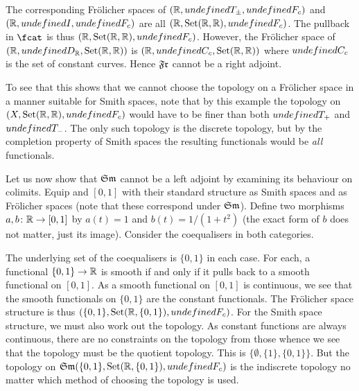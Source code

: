 \documentclass[%
a4paper,%
arxiv,%
defaults
]{myclass}
\begin{document}
The corresponding Fr\"olicher spaces of
 \((\R, \m{T}_\pm, \m{F}_c)\)
and \((\R, \m{I}, \m{F}_c)\)
are all
 \((\R, \Set(\R,\R), \m{F}_c)\).
The pullback in \(\fcat\) is thus
 \((\R, \Set(\R,\R), \m{F}_c)\).
However, the Fr\"olicher space of \((\R, \m{D}_{\R}, \Set(\R,\R))\) is
 \((\R, \m{C}_c, \Set(\R,\R))\)
where \(\m{C}_c\) is the set of constant curves.
Hence \(\SmFr\) cannot be a right adjoint.

To see that this shows that we cannot choose the topology on a Fr\"olicher space in a manner suitable for Smith spaces, note that by this example the topology on \((X, \Set(\R,\R), \m{F}_c)\) would have to be finer than both \(\m{T}_+\) and \(\m{T}_-\).
The only such topology is the discrete topology, but by the completion property of Smith spaces the resulting functionals would be \emph{all} functionals.

\medskip

Let us now show that \(\FrSm\) cannot be a left adjoint by examining its behaviour on colimits.
Equip \R and \([0,1]\) with their standard structure as Smith spaces and as Fr\"olicher spaces (note that these correspond under \(\FrSm\)).
Define two morphisms \(a, b \colon \mathbb{R} \to [0,1]\) by \(a(t) = 1\) and \(b(t) = 1/(1 + t^2)\) (the exact form of \(b\) does not matter, just its image).
Consider the coequalisers in both categories.

The underlying set of the coequalisers is \(\{0,1\}\) in each case.
For each, a functional \(\{0,1\} \to \mathbb{R}\) is smooth if and only if it pulls back to a smooth functional on \([0,1]\).
As a smooth functional on \([0,1]\) is continuous, we see that the smooth functionals on \(\{0,1\}\) are the constant functionals.
The Fr\"olicher space structure is thus \((\{0,1\}, \Set(\R, \{0,1\}), \m{F}_c)\).
For the Smith space structure, we must also work out the topology.
As constant functions are always continuous, there are no constraints on the topology from those whence we see that the topology must be the quotient topology.
This is \(\{\emptyset, \{1\}, \{0,1\}\}\).
But the topology on \(\FrSm(\{0,1\}, \Set(\R, \{0,1\}), \m{F}_c)\) is the indiscrete topology no matter which method of choosing the topology is used.

\medskip
\end{document}
